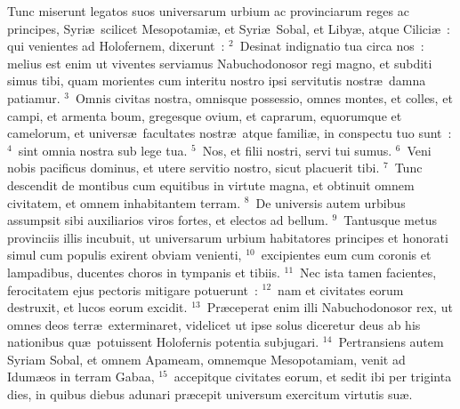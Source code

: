 \bchapter
\lettrine[lines=3,image=true,loversize=0.05,lraise=-0.03]{T}{}unc miserunt legatos suos universarum urbium ac provinciarum reges ac principes, Syri\ae\ scilicet Mesopotami\ae , et Syri\ae\ Sobal, et Liby\ae , atque Cilici\ae~: qui venientes ad Holofernem, dixerunt~:
${}^{2}$~Desinat indignatio tua circa nos~: melius est enim ut viventes serviamus Nabuchodonosor regi magno, et subditi simus tibi, quam morientes cum interitu nostro ipsi servitutis nostr\ae\ damna patiamur.
${}^{3}$~Omnis civitas nostra, omnisque possessio, omnes montes, et colles, et campi, et armenta boum, gregesque ovium, et caprarum, equorumque et camelorum, et univers\ae\ facultates nostr\ae\ atque famili\ae , in conspectu tuo sunt~:
${}^{4}$~sint omnia nostra sub lege tua.
${}^{5}$~Nos, et filii nostri, servi tui sumus.
${}^{6}$~Veni nobis pacificus dominus, et utere servitio nostro, sicut placuerit tibi.
${}^{7}$~Tunc descendit de montibus cum equitibus in virtute magna, et obtinuit omnem civitatem, et omnem inhabitantem terram.
${}^{8}$~De universis autem urbibus assumpsit sibi auxiliarios viros fortes, et electos ad bellum.
${}^{9}$~Tantusque metus provinciis illis incubuit, ut universarum urbium habitatores principes et honorati simul cum populis exirent obviam venienti,
${}^{10}$~excipientes eum cum coronis et lampadibus, ducentes choros in tympanis et tibiis.
${}^{11}$~Nec ista tamen facientes, ferocitatem ejus pectoris mitigare potuerunt~:
${}^{12}$~nam et civitates eorum destruxit, et lucos eorum excidit.
${}^{13}$~Pr\ae ceperat enim illi Nabuchodonosor rex, ut omnes deos terr\ae\ exterminaret, videlicet ut ipse solus diceretur deus ab his nationibus qu\ae\ potuissent Holofernis potentia subjugari.
${}^{14}$~Pertransiens autem Syriam Sobal, et omnem Apameam, omnemque Mesopotamiam, venit ad Idum\ae os in terram Gabaa,
${}^{15}$~accepitque civitates eorum, et sedit ibi per triginta dies, in quibus diebus adunari pr\ae cepit universum exercitum virtutis su\ae .

